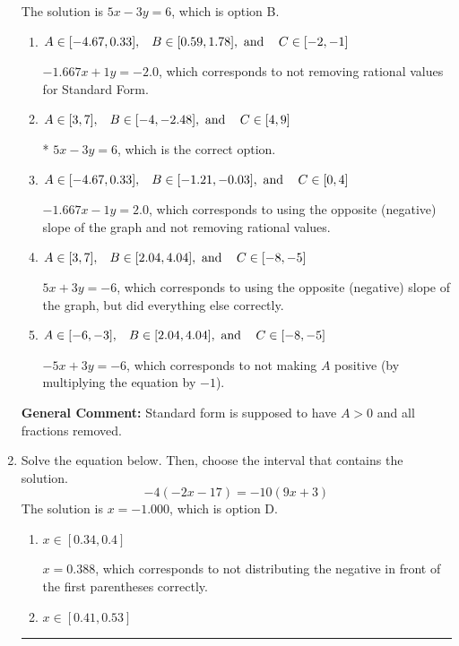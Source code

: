 \documentclass{extbook}[14pt]
\newcommand{\litem}[1]{\item #1

\rule{\textwidth}{0.4pt}}
\begin{document}
\begin{enumerate}
{The solution is \( 5x - 3y = 6 \), which is option B.\begin{enumerate}[label=\Alph*.]
\item \( A \in [-4.67, 0.33], \hspace{3mm} B \in [0.59, 1.78], \text{ and } \hspace{3mm} C \in [-2, -1] \)

 $-1.667x + 1y = -2.0$, which corresponds to not removing rational values for Standard Form.
\item \( A \in [3, 7], \hspace{3mm} B \in [-4, -2.48], \text{ and } \hspace{3mm} C \in [4, 9] \)

* $5x - 3y = 6$, which is the correct option.
\item \( A \in [-4.67, 0.33], \hspace{3mm} B \in [-1.21, -0.03], \text{ and } \hspace{3mm} C \in [0, 4] \)

 $-1.667x - 1y = 2.0$, which corresponds to using the opposite (negative) slope of the graph and not removing rational values.
\item \( A \in [3, 7], \hspace{3mm} B \in [2.04, 4.04], \text{ and } \hspace{3mm} C \in [-8, -5] \)

 $5x + 3y = -6$, which corresponds to using the opposite (negative) slope of the graph, but did everything else correctly.
\item \( A \in [-6, -3], \hspace{3mm} B \in [2.04, 4.04], \text{ and } \hspace{3mm} C \in [-8, -5] \)

 $-5x + 3y = -6$, which corresponds to not making $A$ positive (by multiplying the equation by $-1$).
\end{enumerate}

\textbf{General Comment:} Standard form is supposed to have $A > 0$ and all fractions removed.
}
\litem{
Solve the equation below. Then, choose the interval that contains the solution.
\[ -4(-2x -17) = -10(9x + 3) \]The solution is \( x = -1.000 \), which is option D.\begin{enumerate}[label=\Alph*.]
\item \( x \in [0.34, 0.4] \)

$x = 0.388$, which corresponds to not distributing the negative in front of the first parentheses correctly.
\item \( x \in [0.41, 0.53] \)


\end{enumerate}}
\end{enumerate}
\end{document}

